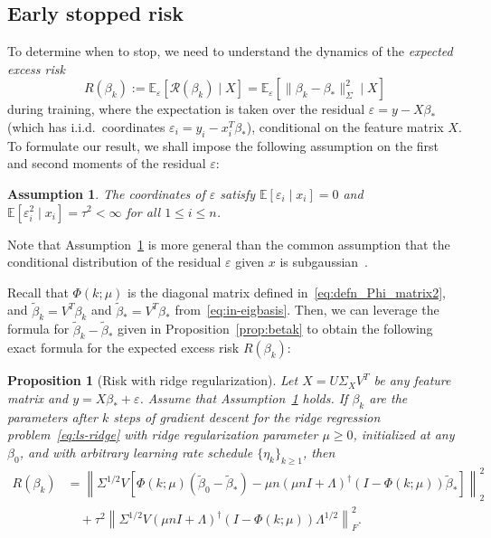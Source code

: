 \documentclass[11pt]{article}
\newtheorem{assumption}{Assumption}
\newtheorem{proposition}[theorem]{Proposition}
\begin{document}
\subsection{Early stopped risk}
To determine when to stop, we need to understand the dynamics of the \emph{expected excess risk}
\begin{equation} \label{eq:expected_risk}
    R(\beta_k) := \mathbb{E}_\varepsilon[\mathcal{R}(\beta_k) \mid X] = \mathbb{E}_\varepsilon[\|\beta_k - \beta_*\|^2_\Sigma \mid X]
\end{equation}
during training, where the expectation is taken over the residual $\varepsilon = y - X \beta_*$ (which has i.i.d.\ coordinates $\varepsilon_i = y_i - x_i^T \beta_*$), conditional on the feature matrix $X$.
To formulate our result, we shall impose the following assumption on the first and second moments of the residual $\varepsilon$:
\begin{assumption} \label{assumption:noise}
    The coordinates of $\varepsilon$ satisfy $\mathbb{E}[\varepsilon_i \mid x_i] = 0$ and $\mathbb{E}[\varepsilon_i^2 \mid x_i] = \tau^2 < \infty$ for all $1 \leq i \leq n$.
\end{assumption}
Note that Assumption~\ref{assumption:noise} is more general than the common assumption that the conditional distribution of the residual $\varepsilon$ given $x$ is subgaussian~\cite{bartlett2020benign, xu2023towards, zou2023benign, raskutti2014early}. 

Recall that $\Phi(k; \mu)$ is the diagonal matrix defined in~\eqref{eq:defn_Phi_matrix2}, and $\tilde{\beta}_k = V^T\beta_k$ and $\tilde{\beta}_* = V^T\beta_*$ from~\eqref{eq:in-eigbasis}. Then, we can leverage the formula for $\tilde{\beta}_k - \tilde{\beta}_*$ given in Proposition~\ref{prop:betak} to obtain the following exact formula for the expected excess risk $R(\beta_k)$:

\begin{proposition}[Risk with ridge regularization] \label{prop:gen-risk-betak-mu}
Let $X = U \Sigma_X V^T$ be any feature matrix and $y = X \beta_* + \varepsilon$. Assume that Assumption~\ref{assumption:noise} holds. If $\beta_k$ are the parameters after $k$ steps of gradient descent for the ridge regression problem~\eqref{eq:ls-ridge} with ridge regularization parameter $\mu \geq 0$, initialized at any $\beta_0$, and with arbitrary learning rate schedule $\{ \eta_k\}_{k \geq 1}$, then
\begin{align*}
    R(\beta_k) &= \left\| \Sigma^{1/2} V \left[ \Phi(k; \mu)(\tilde{\beta}_0 - \tilde{\beta}_*) - \mu n (\mu n I + \Lambda)^\dagger (I - \Phi(k; \mu)) \tilde{\beta}_* \right] \right\|_2^2 \\
    &\quad+ \tau^2 \left\| \Sigma^{1/2} V (\mu n I + \Lambda)^\dagger (I - \Phi(k; \mu)) \Lambda^{1/2} \right\|_F^2.
\end{align*}
\end{proposition}
\end{document}
